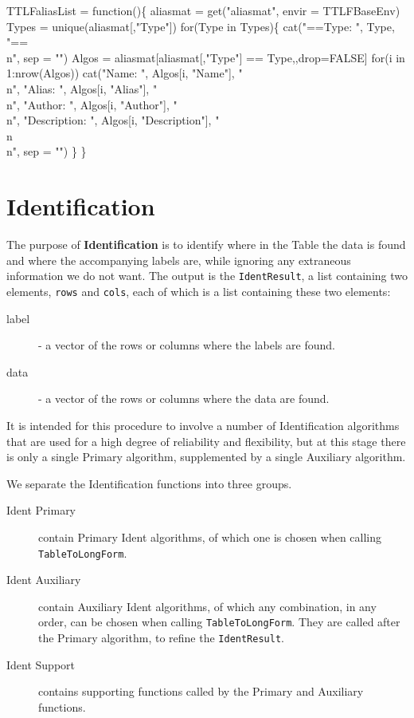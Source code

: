 \documentclass[a4paper]{article}
\begin{document}
TTLFaliasList =
  function()\{
    aliasmat = get("aliasmat", envir = TTLFBaseEnv)
    Types = unique(aliasmat[,"Type"])
    for(Type in Types)\{
      cat("==Type: ", Type, "==\\n", sep = "")
      Algos = aliasmat[aliasmat[,"Type"] == Type,,drop=FALSE]
      for(i in 1:nrow(Algos))
        cat("Name: ", Algos[i, "Name"], "\\n",
            "Alias: ", Algos[i, "Alias"], "\\n",
            "Author: ", Algos[i, "Author"], "\\n",
            "Description: ", Algos[i, "Description"], "\\n\\n",
            sep = "")
    \}
  \}
  
\eatline
{}\nwendcode{}\nwdocspar

\section{Identification}
\label{sec:identification}
The purpose of \textbf{Identification} is to identify where in the
Table the data is found and where the accompanying labels are, while
ignoring any extraneous information we do not want. The output is the
\verb|IdentResult|, a list containing two elements, \verb|rows| and
\verb|cols|, each of which is a list containing these two elements:
\begin{description}
\item[label] - a vector of the rows or columns where the labels are
  found.
\item[data] - a vector of the rows or columns where the data are
  found.
\end{description}

It is intended for this procedure to involve a number of
Identification algorithms that are used for a high degree of
reliability and flexibility, but at this stage there is only a single
Primary algorithm, supplemented by a single Auxiliary algorithm.

We separate the Identification functions into three groups.
\begin{description}
\item[Ident Primary] contain Primary Ident algorithms, of which one is
  chosen when calling \verb|TableToLongForm|.
\item[Ident Auxiliary] contain Auxiliary Ident algorithms, of which
  any combination, in any order, can be chosen when calling
  \verb|TableToLongForm|. They are called after the Primary algorithm,
  to refine the \verb|IdentResult|.
\item[Ident Support] contains supporting functions called by the
  Primary and Auxiliary functions.
\end{description}
\end{document}
